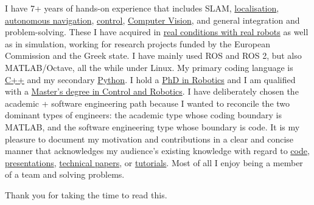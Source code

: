 \documentclass[a4paper,10pt,twoside]{article}
\begin{document}

\par{\bigskip\par}


\vspace{-0.5cm}
\begin{bw_box} \small
  I have 7+ years of hands-on experience that includes SLAM, \href{https://github.com/li9i/fsm-lo}{localisation},
  \href{https://link.springer.com/article/10.1007/s10846-019-01086-y}{autonomous navigation}, \href{https://www.tandfonline.com/doi/full/10.1080/00207179.2018.1514129}{control},
  \href{https://github.com/li9i/pandora\_vision\_2014}{Computer Vision}, and
  general integration and problem-solving. These I have acquired in \href{https://relief.web.auth.gr/\%CF\%81\%CE\%BF\%CE\%BC\%CF\%80\%CE\%BF\%CF\%84\%CE\%B9\%CE\%BA\%CE\%AC-\%CE\%BF\%CF\%87\%CE\%AE\%CE\%BC\%CE\%B1\%CF\%84\%CE\%B1/}{real
  conditions with real robots} as well as in simulation, working for research
  projects funded by the European Commission and the Greek state. I have mainly
  used ROS and ROS 2, but also MATLAB/Octave, all the while under Linux. My
  primary coding language is \href{https://github.com/li9i/fsm}{C++} and my
  secondary
  \href{https://github.com/cultureid-auth-ros-packages/cultureid-waypoints-following}{Python}.
  I hold a \href{https://ikee.lib.auth.gr/record/354644}{PhD in Robotics} and I
  am qualified with a
  \href{http://kth.diva-portal.org/smash/record.jsf?pid=diva2\%3A1102597\&dswid=2875}{Master's degree in Control and Robotics}.
  I have deliberately chosen the academic + software engineering path because I
  wanted to reconcile the two dominant types of engineers: the academic type
  whose coding boundary is MATLAB, and the software engineering type whose
  boundary is code.
  It is my pleasure to document my motivation and contributions in a clear and concise
  manner that acknowledges my audience's existing knowledge with regard to
  \href{https://github.com/li9i/pandora_vision_2014/blob/hydro-devel/pandora_vision_hole_detector/src/hole_fusion_node/hole_fusion.cpp}{code},
  \href{https://www.youtube.com/watch?v=xaDKjI0WkDc}{presentations}, \href{https://ieeexplore.ieee.org/abstract/document/9981228}{technical papers},
  or \href{https://github.com/li9i/ros1_humble_bridge_template}{tutorials}. Most of all I enjoy being a member of a team and solving problems.

  Thank you for taking the time to read this.
\end{bw_box}
\end{document}
